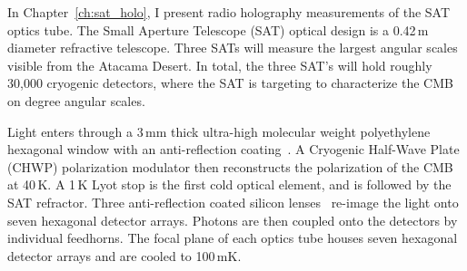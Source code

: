 In Chapter~\ref{ch:sat_holo}, I present radio holography measurements of the SAT optics tube.  The Small Aperture Telescope (SAT) optical design is a 0.42\,m diameter refractive telescope.  Three SATs will measure the largest angular scales visible from the Atacama Desert.  In total, the three SAT's will hold roughly 30,000 cryogenic detectors, where the SAT is targeting to characterize the CMB on degree angular scales.

Light enters through a 3\,mm thick ultra-high molecular weight polyethylene hexagonal window with an anti-reflection coating~\cite{zhu18}.  A Cryogenic Half-Wave Plate (CHWP) polarization modulator then reconstructs the polarization of the CMB at 40\,K.  A 1\,K Lyot stop is the first cold optical element, and is followed by the SAT refractor.  Three anti-reflection coated silicon lenses~\cite{Datta:13,golec20} re-image the light onto seven hexagonal detector arrays.   Photons are then coupled onto the detectors by individual feedhorns.  The focal plane of each optics tube houses seven hexagonal detector arrays and are cooled to 100\,mK.  